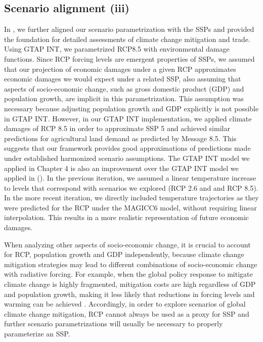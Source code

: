 \subsection{Scenario alignment (iii)}
In , we further aligned our scenario parametrization with the SSPs \citep{oneill_new_2014} and provided the foundation for detailed assessments of climate change mitigation and trade. Using GTAP INT, we parametrized RCP8.5 with environmental damage functions. Since RCP forcing levels are emergent properties of SSPs, we assumed that our projection of economic damages under a given RCP approximates economic damages we would expect under a related SSP, also assuming that aspects of socio-economic change, such as gross domestic product (GDP) and population growth, are implicit in this parametrization. This assumption was necessary because adjusting population growth and GDP explicitly is not possible in GTAP INT. However, in our GTAP INT implementation, we applied climate damages of RCP 8.5 in order to approximate SSP 5 and achieved similar predictions for agricultural land demand as predicted by Message 8.5. This suggests that our framework provides good approximations of predictions made under established harmonized scenario assumptions. The GTAP INT model we applied in Chapter 4 is also an improvement over the GTAP INT model we applied in \citet{kapitza_assessing_2021} (). In the previous iteration, we assumed a linear temperature increase to levels that correspond with scenarios we explored (RCP 2.6 and and RCP 8.5). In the more recent iteration, we directly included temperature trajectories as they were predicted for the RCP under the MAGICC6 model, without requiring linear interpolation. This results in a more realistic representation of future economic damages.

When analyzing other aspects of socio-economic change, it is crucial to account for RCP, population growth and GDP independently, because climate change mitigation strategies may lead to different combinations of socio-economic change with radiative forcing. For example, when the global policy response to mitigate climate change is highly fragmented, mitigation costs are high regardless of GDP and population growth, making it less likely that reductions in forcing levels and warming can be achieved \citep{kriegler_fossil-fueled_2017}. Accordingly, in order to explore scenarios of global climate change mitigation, RCP cannot always be used as a proxy for SSP and further scenario parametrizations will usually be necessary to properly parameterize an SSP.


